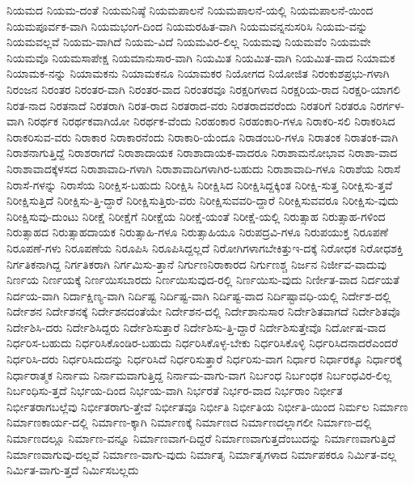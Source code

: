 {ನಿಯಮದ
ನಿಯಮ-ದಂತೆ
ನಿಯಮನಿಷ್ಠೆ
ನಿಯಮಪಾಲನೆ
ನಿಯಮಪಾಲನೆ-ಯಲ್ಲಿ
ನಿಯಮಪಾಲನೆ-ಯಿಂದ
ನಿಯಮಪೂರ್ವಕ-ವಾಗಿ
ನಿಯಮಭಂಗ-ದಿಂದ
ನಿಯಮರಹಿತ-ವಾಗಿ
ನಿಯಮವನ್ನನುಸರಿಸಿ
ನಿಯಮ-ವನ್ನು
ನಿಯಮವಲ್ಲವೆ
ನಿಯಮ-ವಾಗಿದೆ
ನಿಯಮ-ವಿದೆ
ನಿಯಮವಿರ-ಲಿಲ್ಲ
ನಿಯಮವು
ನಿಯಮವೆಂ
ನಿಯಮವೇ
ನಿಯಮವೊ
ನಿಯಮಸಾಪೇಕ್ಷ
ನಿಯಮಾನುಸಾರ-ವಾಗಿ
ನಿಯಮಿತ
ನಿಯಮಿತ-ವಾಗಿ
ನಿಯಮಿತ-ವಾದ
ನಿಯಾಮಕ
ನಿಯಾಮಕ-ನನ್ನು
ನಿಯಾಮಕನು
ನಿಯಾಮಕನೂ
ನಿಯಾಮಕರ
ನಿಯೋಗದ
ನಿಯೋಜಿತ
ನಿರಂಕುಶಪ್ರಭು-ಗಳಾಗಿ
ನಿರಂಜನ
ನಿರಂತರ
ನಿರಂತರ-ವಾಗಿ
ನಿರಂತರ-ವಾದ
ನಿರಂತರವೂ
ನಿರಕ್ಷರಿಗಳಾದ
ನಿರಕ್ಷರಿಯ-ರಾದ
ನಿರಕ್ಷರಿ-ಯಾಗಲಿ
ನಿರತ-ನಾದ
ನಿರತನಾದೆ
ನಿರತರಾಗಿ
ನಿರತ-ರಾದ
ನಿರತರಾದ-ವರು
ನಿರತರಾದವರೆಂದು
ನಿರತರಿಗೆ
ನಿರತರೂ
ನಿರರ್ಗಳ-ವಾಗಿ
ನಿರರ್ಥಕ
ನಿರರ್ಥಕವಾಗಿಯೋ
ನಿರರ್ಥಕ-ವೆಂದು
ನಿರಹಂಕಾರ
ನಿರಹಂಕಾರಿ-ಗಳೂ
ನಿರಾಕರಿ-ಸಲಿ
ನಿರಾಕರಿಸಿದ
ನಿರಾಕರಿಸುವ-ವರು
ನಿರಾಕಾರ
ನಿರಾಕಾರನೆಂದು
ನಿರಾಕಾರಿ-ಯೆಂದೂ
ನಿರಾಡಂಬರಿ-ಗಳೂ
ನಿರಾತಂಕ
ನಿರಾತಂಕ-ವಾಗಿ
ನಿರಾಶನಾಗುತ್ತಿದ್ದೆ
ನಿರಾಶರಾಗದೆ
ನಿರಾಶಾದಾಯಕ
ನಿರಾಶಾದಾಯಕ-ವಾದರೂ
ನಿರಾಶಾಮನೋಭಾವ
ನಿರಾಶಾ-ವಾದ
ನಿರಾಶಾವಾದಕ್ಕೆಳಸದ
ನಿರಾಶಾವಾದಿ-ಗಳಾಗಿ
ನಿರಾಶಾವಾದಿಗಳಾಗಿರ-ಬಹುದು
ನಿರಾಶಾವಾದಿ-ಗಳೂ
ನಿರಾಶೆಯ
ನಿರಾಸೆ
ನಿರಾಸೆ-ಗಳನ್ನು
ನಿರಾಸೆಯ
ನಿರೀಕ್ಷಿಸ-ಬಹುದು
ನಿರೀಕ್ಷಿಸಿ
ನಿರೀಕ್ಷಿಸಿದ
ನಿರೀಕ್ಷಿಸಿದ್ದಕ್ಕಿಂತ
ನಿರೀಕ್ಷಿ-ಸುತ್ತ
ನಿರೀಕ್ಷಿಸು-ತ್ತವೆ
ನಿರೀಕ್ಷಿಸುತ್ತಿದೆ
ನಿರೀಕ್ಷಿಸು-ತ್ತಿ-ದ್ದಾರೆ
ನಿರೀಕ್ಷಿಸುತ್ತಿರು-ವರು
ನಿರೀಕ್ಷಿಸುವವರಿ-ದ್ದಾರೆ
ನಿರೀಕ್ಷಿಸುವವರೂ
ನಿರೀಕ್ಷಿಸು-ವುದು
ನಿರೀಕ್ಷಿಸುವು-ದುಂಟು
ನಿರೀಕ್ಷೆ
ನಿರೀಕ್ಷೆಗೆ
ನಿರೀಕ್ಷೆಯ
ನಿರೀಕ್ಷೆ-ಯಂತೆ
ನಿರೀಕ್ಷೆ-ಯಲ್ಲಿ
ನಿರುತ್ಸಾಹ
ನಿರುತ್ಸಾಹ-ಗಳಿಂದ
ನಿರುತ್ಸಾಹದ
ನಿರುತ್ಸಾಹದಾಯಕ
ನಿರುತ್ಸಾಹಿ-ಗಳೂ
ನಿರುತ್ಸಾಹಿಯೂ
ನಿರುಪದ್ರವಿ-ಗಳೂ
ನಿರುಪಯುಕ್ತ
ನಿರೂಪಣೆ
ನಿರೂಪಣೆ-ಗಳು
ನಿರೂಪಣೆಯ
ನಿರೂಪಿಸಿ
ನಿರೂಪಿಸಿದ್ದಲ್ಲದೆ
ನಿರೋಗಿಗಳಾಗಬೇಕಿತ್ತುಇ-ದಕ್ಕೆ
ನಿರೋಧಕ
ನಿರೋಧಶಕ್ತಿ
ನಿರ್ಗತಿಕನಾಗಿದ್ದ
ನಿರ್ಗತಿಕರಾಗಿ
ನಿರ್ಗಮಿಸು-ತ್ತಾನೆ
ನಿರ್ಗುಣನಿರಾಕಾರದ
ನಿರ್ಗುಣಶ್ಚ
ನಿರ್ಜನ
ನಿರ್ಜೀವ-ವಾದುವು
ನಿರ್ಣಯ
ನಿರ್ಣಯಕ್ಕೆ
ನಿರ್ಣಯಿಸಬಾರದು
ನಿರ್ಣಯಿಸುವುದ-ರಲ್ಲಿ
ನಿರ್ಣಯಿಸು-ವುದು
ನಿರ್ಣೀತ-ವಾದ
ನಿರ್ದಯತೆ
ನಿರ್ದಯ-ವಾಗಿ
ನಿರ್ದಾಕ್ಷಿಣ್ಯ-ವಾಗಿ
ನಿರ್ದಿಷ್ಟ
ನಿರ್ದಿಷ್ಟ-ವಾಗಿ
ನಿರ್ದಿಷ್ಟ-ವಾದ
ನಿರ್ದಿಷ್ಟಾವಧಿ-ಯಲ್ಲಿ
ನಿರ್ದೇಶ-ದಲ್ಲಿ
ನಿರ್ದೇಶನ
ನಿರ್ದೇಶನಕ್ಕೆ
ನಿರ್ದೇಶನದಂತೆಯೇ
ನಿರ್ದೇಶನ-ದಲ್ಲಿ
ನಿರ್ದೇಶಾನುಸಾರ
ನಿರ್ದೇಶಿತವಾಗದೆ
ನಿರ್ದೇಶಿತವೊ
ನಿರ್ದೇಶಿಸಿ-ದರು
ನಿರ್ದೇಶಿಸಿದ್ದರು
ನಿರ್ದೇಶಿಸುತ್ತಾರೆ
ನಿರ್ದೇಶಿಸು-ತ್ತಿ-ದ್ದಾರೆ
ನಿರ್ದೇಶಿಸುತ್ತೇವೊ
ನಿರ್ದೋಷ-ವಾದ
ನಿರ್ಧರಿಸ-ಬಹುದು
ನಿರ್ಧರಿಸಿಕೊಂಡಿರ-ಬಹುದು
ನಿರ್ಧರಿಸಿಕೊಳ್ಳ-ಬೇಕು
ನಿರ್ಧರಿಸಿಕೊಳ್ಳಿ
ನಿರ್ಧರಿಸಿದನಾದರೆಎಂದರೆ
ನಿರ್ಧರಿಸಿ-ದರು
ನಿರ್ಧರಿಸಿದುದನ್ನು
ನಿರ್ಧರಿಸಿದೆ
ನಿರ್ಧರಿಸುತ್ತಾರೆ
ನಿರ್ಧರಿಸು-ವಾಗ
ನಿರ್ಧಾರ
ನಿರ್ಧಾರಕ್ಕೂ
ನಿರ್ಧಾರಕ್ಕೆ
ನಿರ್ಧಾರಾತ್ಮಕ
ನಿರ್ನಾಮ
ನಿರ್ನಾಮವಾಗುತ್ತಿದ್ದ
ನಿರ್ನಾಮ-ವಾಗು-ವಾಗ
ನಿರ್ಬಂಧ
ನಿರ್ಬಂಧಕ
ನಿರ್ಬಂಧವಿರ-ಲಿಲ್ಲ
ನಿರ್ಬಂಧಿಸು-ತ್ತದೆ
ನಿರ್ಭಯ-ದಿಂದ
ನಿರ್ಭಯ-ವಾಗಿ
ನಿರ್ಭರತೆ
ನಿರ್ಭರ-ವಾದ
ನಿರ್ಭರಾಂ
ನಿರ್ಭೀತ
ನಿರ್ಭೀತರಾಗಬಲ್ಲೆವು
ನಿರ್ಭೀತರಾಗು-ತ್ತೇವೆ
ನಿರ್ಭೀತವೂ
ನಿರ್ಭೀತಿ
ನಿರ್ಭೀತಿಯ
ನಿರ್ಭೀತಿ-ಯಿಂದ
ನಿರ್ಮಲ
ನಿರ್ಮಾಣ
ನಿರ್ಮಾಣಕಾರ್ಯ-ದಲ್ಲಿ
ನಿರ್ಮಾಣ-ಕ್ಕಾಗಿ
ನಿರ್ಮಾಣಕ್ಕೆ
ನಿರ್ಮಾಣದ
ನಿರ್ಮಾಣದಲ್ಲಾಗಲೀ
ನಿರ್ಮಾಣ-ದಲ್ಲಿ
ನಿರ್ಮಾಣದಲ್ಲೂ
ನಿರ್ಮಾಣ-ವನ್ನೂ
ನಿರ್ಮಾಣವಾಗ-ದಿದ್ದರೆ
ನಿರ್ಮಾಣವಾಗುತ್ತದೆಂಬುದನ್ನು
ನಿರ್ಮಾಣವಾಗುತ್ತಿದೆ
ನಿರ್ಮಾಣವಾಗುವು-ದಲ್ಲವೆ
ನಿರ್ಮಾಣ-ವಾಗು-ವುದು
ನಿರ್ಮಾತೃ
ನಿರ್ಮಾತೃಗಳಾದ
ನಿರ್ಮಾಪಕರೂ
ನಿರ್ಮಿತ-ವಲ್ಲ
ನಿರ್ಮಿತ-ವಾಗು-ತ್ತದೆ
ನಿರ್ಮಿಸಬಲ್ಲದು
}
